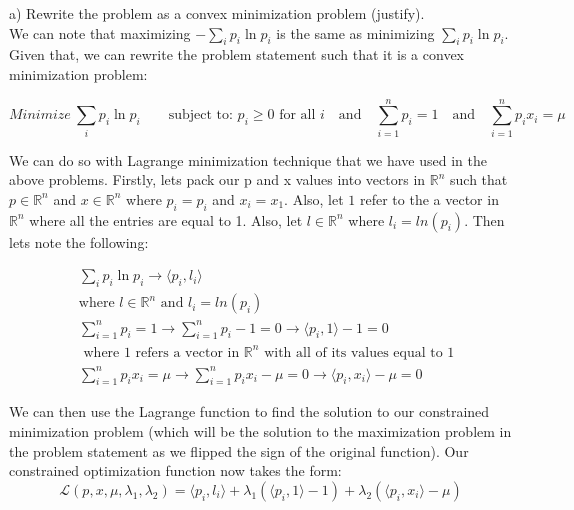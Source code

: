 \documentclass[12pt,twoside]{article}
\newcommand{\R}{\mathbb{R}}
\newcommand{\Lagr}{\mathcal{L}}
\begin{document}
a) Rewrite the problem as a convex minimization problem (justify). \\

We can note that maximizing $-\sum_i p_i \ln p_i$ is the same as minimizing $\sum_i p_i \ln p_i$. Given that, we can rewrite the problem statement such that it is a convex minimization problem:

$$
 Minimize \ \sum_i p_i \ln p_i \qquad \text{subject to: }
 p_i \geq 0 \text{ for all } i
		\quad \text{and} \quad \sum_{i=1}^n p_i = 1
		\quad \text{and} \quad \sum_{i=1}^n p_i x_i = \mu$$ 
		
We can do so with Lagrange minimization technique that we have used in the above problems. Firstly, lets pack our p and x values into vectors in $\R^n$ such that $p \in \R^n$ and $x \in \R^n$ where $p_i = p_i$ and $x_i = x_1$. Also, let $1$ refer to the a vector in $\R^n$ where all the entries are equal to 1. Also, let $l \in \R^n$ where $l_i = ln(p_i)$. Then lets note the following:

\begin{equation}
    \begin{split}
         &\sum_i p_i \ln p_i \rightarrow \langle p_i, l_i \rangle \qquad \\
         &\text{where } l \in \R^n \text{ and } l_i = ln(p_i) \\
         &\sum_{i=1}^n p_i = 1 \rightarrow \sum_{i=1}^n p_i - 1 = 0 \rightarrow \langle p_i, 1 \rangle -1 = 0 \\
         &\text{ where } 1 \text{ refers a vector in } \R^n \text{ with all of its values equal to 1}\\
         & \sum_{i=1}^n p_i x_i = \mu \rightarrow \sum_{i=1}^n p_i x_i - \mu = 0  \rightarrow \langle p_i, x_i \rangle -\mu = 0
    \end{split}
\end{equation}

We can then use the Lagrange function to find the solution to our constrained minimization problem (which will be the solution to the maximization problem in the problem statement as we flipped the sign of the original function). Our constrained optimization function now takes the form:
$$
    \Lagr (p,x,\mu, \lambda_1,\lambda_2) = \langle p_i, l_i \rangle + 
    \lambda_1(\langle p_i, 1 \rangle -1) + \lambda_2(\langle p_i, x_i \rangle -\mu)
$$

\newpage
\end{document}
